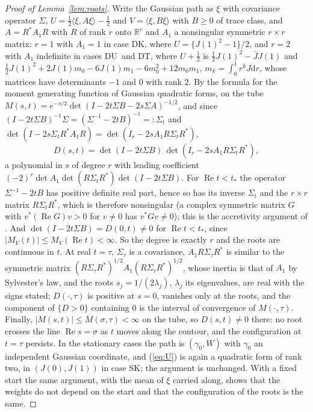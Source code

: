 \documentclass[ecta,nameyear,final]{econsocart}
\newcommand{\dr}[1]{{\mathrm d}#1}
\newcommand{\Rea}{\operatorname{Re}}
\newcommand{\Fk}{\textsf{\upshape DK}}
\newcommand{\Fu}{\textsf{\upshape DU}}
\newcommand{\Ft}{\textsf{\upshape DT}}
\newcommand{\Sk}{\textsf{\upshape SK}}
\theoremstyle{plain}
\theoremstyle{definition}
\begin{document}
\begin{appendix}
\begin{proof}[Proof of Lemma~\ref{lem:roots}]
Write the Gaussian path as $\xi$ with covariance operator $\Sigma$, $U=\frac12\langle\xi,A\xi\rangle-\frac12$ and $V=\langle\xi,B\xi\rangle$ with $B\ge0$ of trace class, and $A=R^*A_1R$ with $R$ of rank $r$ onto $\mathbb{R}^r$ and $A_1$ a nonsingular symmetric $r\times r$ matrix: $r=1$ with $A_1=1$ in case \Fk, where $U=\{J(1)^2-1\}/2$, and $r=2$ with $A_1$ indefinite in cases \Fu\ and \Ft, where $U+\frac12$ is $\frac12J(1)^2-\bar JJ(1)$ and $\frac12J(1)^2+2J(1)m_0-6J(1)m_1-6m_0^2+12m_0m_1$, $m_k=\int_0^1r^kJ\dr{r}$, whose matrices have determinants $-1$ and $0$ with rank $2$.  By the formula for the moment generating function of Gaussian quadratic forms, on the tube $M(s,t)=e^{-s/2}\det(I-2t\Sigma B-2s\Sigma A)^{-1/2}$, and since $(I-2t\Sigma B)^{-1}\Sigma=(\Sigma^{-1}-2tB)^{-1}=:\Sigma_t$ and $\det(I-2s\Sigma_tR^*A_1R)=\det(I_r-2sA_1R\Sigma_tR^*)$,
\[
D(s,t)=\det(I-2t\Sigma B)\,\det(I_r-2sA_1R\Sigma_tR^*),
\]
a polynomial in $s$ of degree $r$ with leading coefficient $(-2)^r\det A_1\det(R\Sigma_tR^*)\det(I-2t\Sigma B)$.  For $\Rea t<t_*$ the operator $\Sigma^{-1}-2tB$ has positive definite real part, hence so has its inverse $\Sigma_t$ and the $r\times r$ matrix $R\Sigma_tR^*$, which is therefore nonsingular (a complex symmetric matrix $G$ with $v^*(\Rea G)v>0$ for $v\ne0$ has $v^*Gv\ne0$); this is the accretivity argument of \cite{BaoKan2026}.  And $\det(I-2t\Sigma B)=D(0,t)\ne0$ for $\Rea t<t_*$, since $|M_V(t)|\le M_V(\Rea t)<\infty$.  So the degree is exactly $r$ and the roots are continuous in $t$.  At real $t=\tau$, $\Sigma_\tau$ is a covariance, $A_1R\Sigma_\tau R^*$ is similar to the symmetric matrix $(R\Sigma_\tau R^*)^{1/2}A_1(R\Sigma_\tau R^*)^{1/2}$, whose inertia is that of $A_1$ by Sylvester's law, and the roots $s_j=1/(2\lambda_j)$, $\lambda_j$ its eigenvalues, are real with the signs stated; $D(\cdot,\tau)$ is positive at $s=0$, vanishes only at the roots, and the component of $\{D>0\}$ containing $0$ is the interval of convergence of $M(\cdot,\tau)$.  Finally, $|M(s,t)|\le M(\sigma,\tau)<\infty$ on the tube, so $D(s,t)\ne0$ there: no root crosses the line $\Rea s=\sigma$ as $t$ moves along the contour, and the configuration at $t=\tau$ persists.  In the stationary cases the path is $(\gamma_0,W)$ with $\gamma_0$ an independent Gaussian coordinate, and (\ref{eq:U}) is again a quadratic form of rank two, in $(J(0),J(1))$ in case \Sk; the argument is unchanged.  With a fixed start the same argument, with the mean of $\xi$ carried along, shows that the weights do not depend on the start and that the configuration of the roots is the same.

\end{proof}
\end{appendix}
\end{document}
